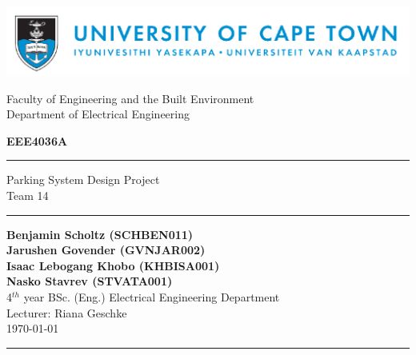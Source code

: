 \newcommand{\homedir}{/home/bscholtz/workspace/workspace-latex/2016-Design-Project/LATEX/}



\newcommand{\coursecode}{EEE4036A}
\newcommand{\assignment}{Parking System Design Project\\Team 14}
\newcommand{\lecturer}{Riana Geschke}

\pagestyle{fancy}
\fancyhf{}
\cfoot{\thepage}


\begin{titlepage} 
\includegraphics[width = 17cm]{images/uctbanner.png} \\

\begin{center}
\begin{LARGE}
Faculty of Engineering and the Built Environment \\
Department of Electrical Engineering \\
\end{LARGE}
\end{center}

\begin{center}  
\begin{Huge}
\textbf{\coursecode}\\
\bigskip
\bigskip
\hrule
\assignment \\
\end{Huge}

\vspace*{\fill}

\hrule
\begin{center}
\textbf{Benjamin Scholtz (SCHBEN011)\\
Jarushen Govender (GVNJAR002)\\
Isaac Lebogang Khobo (KHBISA001)\\
Nasko Stavrev (STVATA001)\\}
4$^{th}$ year BSc. (Eng.) Electrical Engineering Department\\
Lecturer: \lecturer \\
\today
\end{center}
\bigskip
\hrule

\end{center}
\end{titlepage}

